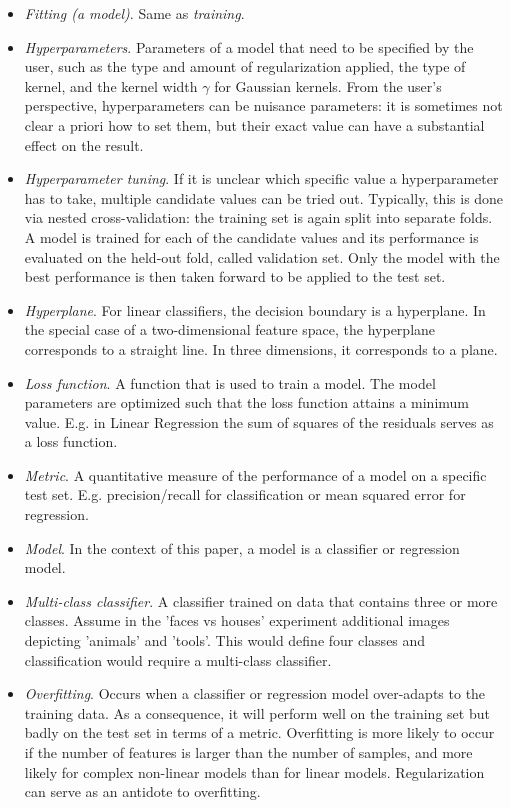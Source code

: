 \documentclass[utf8]{frontiersSCNS} %
\begin{document}
\begin{itemize}
\item \textit{Fitting (a model)}. Same as \textit{training}.
\item \textit{Hyperparameters}. Parameters of a model that need to be specified by the user, such as the type and amount of regularization applied, the type of kernel, and the kernel width $\gamma$ for Gaussian kernels. From the user's perspective, hyperparameters can be nuisance parameters: it is sometimes not clear a priori how to set them, but their exact value can have a substantial effect on the result.
\item \textit{Hyperparameter tuning}. If it is unclear which specific value a hyperparameter has to take, multiple candidate values can be tried out. Typically, this is done via nested cross-validation: the training set is again split into separate folds. A model is trained for each of the candidate values and its performance is evaluated on the held-out fold, called validation set. Only the model with the best performance is then taken forward to be applied to the test set.
\item \textit{Hyperplane}. For linear classifiers, the decision boundary is a hyperplane. In the special case of a two-dimensional feature space, the hyperplane corresponds to a straight line. In three dimensions, it corresponds to a plane. 
\item \textit{Loss function}. A function that is used to train a model. The model parameters are optimized such that the loss function attains a minimum value. E.g. in Linear Regression the sum of squares of the residuals serves as a loss function.
\item \textit{Metric}. A quantitative measure of the performance of a model on a specific test set. E.g. precision/recall for classification or mean squared error for regression.
\item \textit{Model}. In the context of this paper, a model is a classifier or regression model.
\item \textit{Multi-class classifier}. A classifier trained on data that contains three or more classes. Assume in the 'faces vs houses' experiment additional images depicting 'animals' and 'tools'. This would define four classes and classification would require a multi-class classifier.
\item \textit{Overfitting}. Occurs when a classifier or regression model over-adapts to the training data. As a consequence, it will perform well on the training set but badly on the test set in terms of a metric. Overfitting is more likely to occur if the number of features is larger than the number of samples, and more likely for complex non-linear models than for linear models. Regularization can serve as an antidote to overfitting.

\end{itemize}
\end{document}

